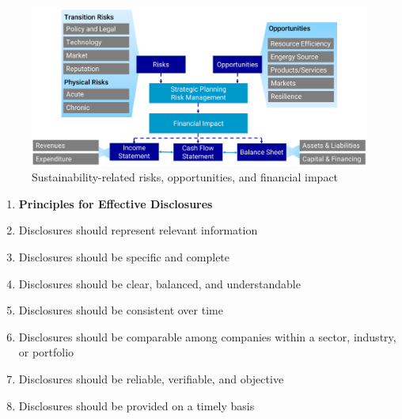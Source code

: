 \documentclass[11pt]{article}
\theoremstyle{definition}
\begin{document}
\begin{figure}[H]
	\centering
	\includegraphics[width=0.8\linewidth]{img/sustainability_risks_opportunities_impact}
	\caption{Sustainability-related risks, opportunities, and financial impact}
	\label{fig:sustainabilityrisksopportunitiesimpact}
\end{figure}

\begin{enumerate}
	\item[] \textbf{Principles for Effective Disclosures}
	\item Disclosures should represent relevant information
	\item Disclosures should be specific and complete
	\item Disclosures should be clear, balanced, and understandable
	\item Disclosures should be consistent over time
	\item Disclosures should be comparable among companies within a sector, industry, or portfolio
	\item Disclosures should be reliable, verifiable, and objective
	\item Disclosures should be provided on a timely basis
\end{enumerate}

\clearpage
\end{document}
